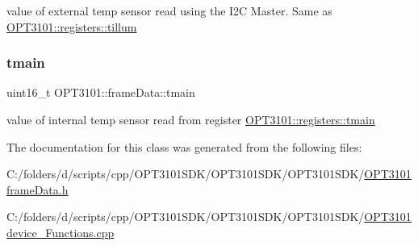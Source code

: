 value of external temp sensor read using the I2C Master. Same as \mbox{\hyperlink{class_o_p_t3101_1_1registers_a8a097a41ecdf2b98226c4a3a92121c12}{O\+P\+T3101\+::registers\+::tillum}} 

\mbox{\label{class_o_p_t3101_1_1frame_data_ae75ca7e9fa494b4d711eb070d5cab45b}} 
\subsubsection{\texorpdfstring{tmain}{tmain}}
{\footnotesize\ttfamily uint16\+\_\+t O\+P\+T3101\+::frame\+Data\+::tmain}



value of internal temp sensor read from register \mbox{\hyperlink{class_o_p_t3101_1_1registers_a3dfd8d81d4cb04d274007deb7c6122fc}{O\+P\+T3101\+::registers\+::tmain}} 



The documentation for this class was generated from the following files\+:\begin{DoxyCompactItemize}
\item 
C\+:/folders/d/scripts/cpp/\+O\+P\+T3101\+S\+D\+K/\+O\+P\+T3101\+S\+D\+K/\+O\+P\+T3101\+S\+D\+K/\mbox{\hyperlink{_o_p_t3101frame_data_8h}{O\+P\+T3101frame\+Data.\+h}}\item 
C\+:/folders/d/scripts/cpp/\+O\+P\+T3101\+S\+D\+K/\+O\+P\+T3101\+S\+D\+K/\+O\+P\+T3101\+S\+D\+K/\mbox{\hyperlink{_o_p_t3101device___functions_8cpp}{O\+P\+T3101device\+\_\+\+Functions.\+cpp}}\end{DoxyCompactItemize}
